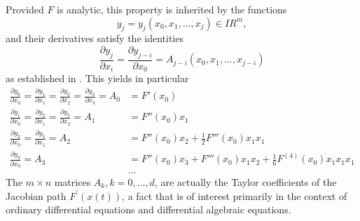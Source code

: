 \documentclass[11pt,twoside]{article}
\begin{document}
Provided $F$ is analytic, this property is inherited by the functions
\[
y_j = y_j (x_0,x_1, \ldots ,x_j) \in {I\!\!R}^m ,
\]
and their derivatives satisfy the identities
\begin{equation}
\label{eq:identity}
\frac{\partial y_j}{\partial x_i}  = \frac{\partial y_{j-i}}
{\partial x_0} = A_{j-i}(x_0,x_1, \ldots ,x_{j-i}) 
\end{equation}
as established in \cite{Chri91a}. This yields in particular
\begin{align*}
  \frac{\partial y_0}{\partial x_0} =
  \frac{\partial y_1}{\partial x_1} =
  \frac{\partial y_2}{\partial x_2} =
  \frac{\partial y_3}{\partial x_3} =
  A_0 & = F'(x_0) \\
  \frac{\partial y_1}{\partial x_0} =
  \frac{\partial y_2}{\partial x_1} =
  \frac{\partial y_3}{\partial x_2} =
  A_1 & = F''(x_0) x_1 \\
  \frac{\partial y_2}{\partial x_0} =
  \frac{\partial y_3}{\partial x_1} =
  A_2 & = F''(x_0) x_2 + \frac{1}{2}F'''(x_0)x_1 x_1 \\
  \frac{\partial y_3}{\partial x_0} =
  A_3 & = F''(x_0) x_3 + F'''(x_0)x_1 x_2
          + \frac{1}{6}F^{(4)}(x_0)x_1 x_1 x_1 \\
  & \ldots
\end{align*}
The $m \times n$ matrices $A_k, k=0,\ldots,d$, are actually the Taylor
coefficients of the Jacobian path $F^\prime(x(t))$, a fact that is of 
interest primarily in the context of ordinary differential 
equations and differential algebraic equations. 
\end{document}
